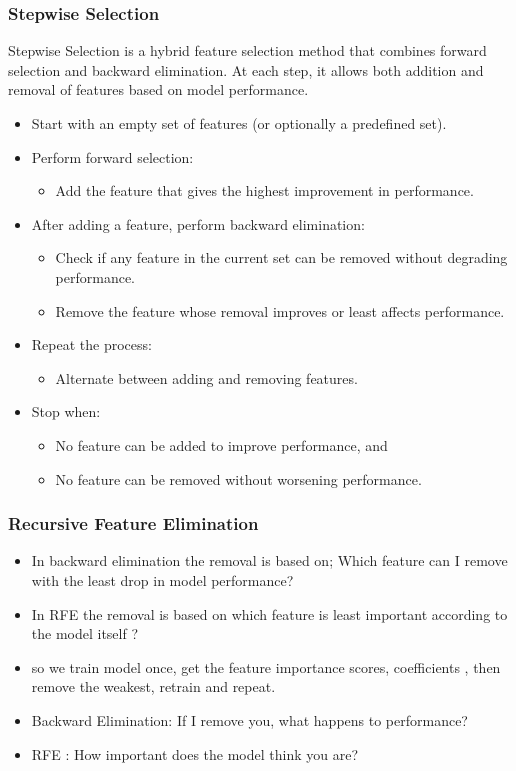 \documentclass[10pt,a4paper]{article}
\begin{document}
	\subsubsection{Stepwise Selection}
	
	Stepwise Selection is a hybrid feature selection method that combines forward selection and backward elimination. At each step, it allows both addition and removal of features based on model performance.
	
	\begin{itemize}
	    \item Start with an empty set of features (or optionally a predefined set).
	    \item Perform forward selection:
	    \begin{itemize}
	        \item Add the feature that gives the highest improvement in performance.
	    \end{itemize}
	    \item After adding a feature, perform backward elimination:
	    \begin{itemize}
	        \item Check if any feature in the current set can be removed without degrading performance.
	        \item Remove the feature whose removal improves or least affects performance.
	    \end{itemize}
	    \item Repeat the process:
	    \begin{itemize}
	        \item Alternate between adding and removing features.
	    \end{itemize}
	    \item Stop when:
	    \begin{itemize}
	        \item No feature can be added to improve performance, and
	        \item No feature can be removed without worsening performance.
	    \end{itemize}
	\end{itemize}

	\subsubsection{Recursive Feature Elimination}

	\begin{itemize}
		\item In backward elimination the removal is based on; Which feature can I remove with the least drop in model performance?
		\item In RFE the removal is based on which feature is least important according to the model itself ?
		\item so we train model once, get the feature importance scores, coefficients , then remove the weakest, retrain and repeat.
		\item Backward Elimination: If I remove you, what happens to performance?
		\item RFE : How important does the model think you are?
	\end{itemize}
	
\end{document}
